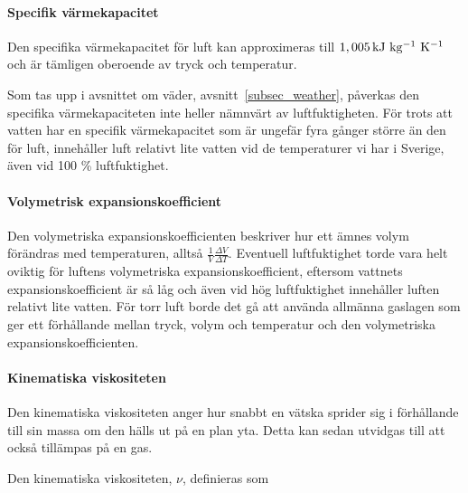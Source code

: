 
\paragraph{Specifik värmekapacitet}
Den specifika värmekapacitet för luft kan approximeras till $\unit[1,005]{kJ~kg^{-1}~K^{-1}}$ och är tämligen oberoende av tryck och temperatur.\cite{engineeringtoolbox}

Som tas upp i avsnittet om väder, avsnitt~\ref{subsec_weather}, påverkas den specifika värmekapaciteten inte heller nämnvärt av luftfuktigheten. För trots att vatten har en specifik värmekapacitet som är ungefär fyra gånger större än den för luft, innehåller luft relativt lite vatten vid de temperaturer vi har i Sverige, även vid 100 \% luftfuktighet.

\paragraph{Volymetrisk expansionskoefficient} %
Den volymetriska expansionskoefficienten beskriver hur ett ämnes volym förändras med temperaturen, alltså $\frac{1}{V}\frac{\Delta V}{\Delta T}$.  Eventuell luftfuktighet torde vara helt oviktig för luftens volymetriska expansionskoefficient, eftersom vattnets expansionskoefficient är så låg och även vid hög luftfuktighet innehåller luften relativt lite vatten. För torr luft borde det gå att använda allmänna gaslagen som ger ett förhållande mellan tryck, volym och temperatur och den volymetriska expansionskoefficienten.%




\paragraph{Kinematiska viskositeten} %
Den kinematiska viskositeten anger hur snabbt en vätska sprider sig i förhållande till sin massa om den hälls ut på en plan yta. Detta kan sedan utvidgas till att också tillämpas på en gas.

Den kinematiska viskositeten, $\nu$, definieras som \cite{kinematiskviskositet}

